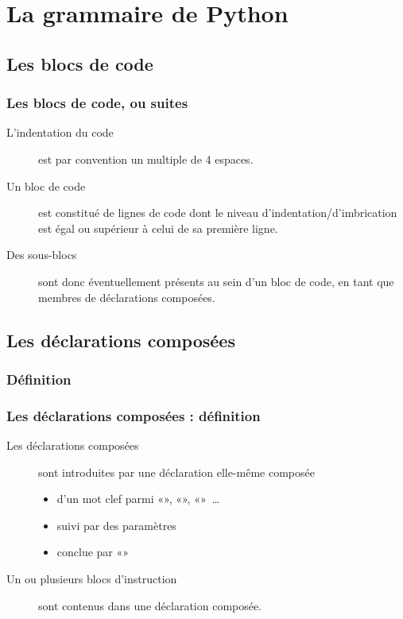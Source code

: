 \section{La grammaire de Python}

\subsection{Les blocs de code}
\begin{frame}[fragile]
  \frametitle{Les blocs de code, ou suites}
  \begin{description}
  \item[L'indentation du code] est par convention un multiple de 4 espaces. \pause
  \item[Un bloc de code] est constitué de lignes de code dont le niveau d'indentation/d'imbrication est égal ou supérieur à celui de sa première ligne. \pause
  \item[Des sous-blocs] sont donc éventuellement présents au sein d'un bloc de code, en tant que membres de déclarations composées.
  \end{description}
\end{frame}

\subsection{Les déclarations composées}
\subsubsection{Définition}
\begin{frame}[fragile]
  \frametitle{Les déclarations composées : définition}
  \begin{description}
  \item[Les déclarations composées] sont introduites par une déclaration elle-même composée \pause
  \begin{itemize}
      \item d'un mot clef parmi «», «», «»~\ldots \pause
      \item suivi par des paramètres \pause
      \item conclue par «\hlcmd{:}» \pause
  \end{itemize}
  \item[Un ou plusieurs blocs d'instruction] sont contenus dans une déclaration composée.
  \end{description}
\end{frame}


